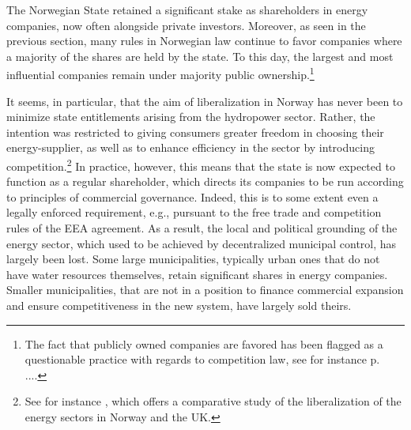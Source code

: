 The Norwegian State retained a significant stake as shareholders in energy companies, now often alongside private investors. Moreover, as seen in the previous section, many rules in Norwegian law continue to favor companies where a majority of the shares are held by the state. To this day, the largest and most influential companies remain under majority public ownership.\footnote{The fact that publicly owned companies are favored has been flagged as a questionable practice with regards to competition law, see for instance \cite{efta07} p. ....} 


It seems, in particular, that the aim of liberalization in Norway has never been to minimize state entitlements arising from the  hydropower sector. Rather, the intention was restricted to giving consumers greater freedom in choosing their energy-supplier, as well as to enhance efficiency in the sector by introducing competition.\footnote{See for instance \cite{liberal}, which offers a comparative study of the liberalization of the energy sectors in Norway and the UK.} In practice, however, this means that the state is now expected to function as a regular shareholder, which directs its companies to be run according to principles of commercial governance. Indeed, this is to some extent even a legally enforced requirement, e.g., pursuant to the free trade and competition rules of the EEA agreement. As a result, the local and political grounding of the energy sector, which used to be achieved by decentralized municipal control, has largely been lost. Some large municipalities, typically urban ones that do not have water resources themselves, retain significant shares in energy companies. Smaller municipalities, that are not in a position to finance commercial expansion and ensure competitiveness in the new system, have largely sold theirs.

